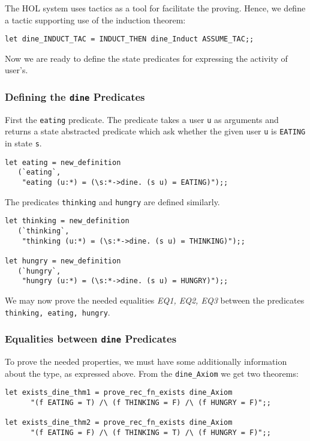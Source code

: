 The HOL system uses tactics as a tool for facilitate the proving.  Hence,
we define a tactic supporting use of the induction theorem:
{\footnotesize 
\begin{verbatim}
let dine_INDUCT_TAC = INDUCT_THEN dine_Induct ASSUME_TAC;;
\end{verbatim}
}

Now we are ready to define the state predicates for expressing the activity of
user's.

\subsubsection{Defining the {\tt dine} Predicates}

First the {\tt eating} predicate.  The predicate takes a user {\tt u} as
arguments and returns a state abstracted predicate which ask whether the given
user {\tt u} is {\tt EATING} in state {\tt s}.

{\footnotesize 
\begin{verbatim}
let eating = new_definition
   (`eating`,
    "eating (u:*) = (\s:*->dine. (s u) = EATING)");;
\end{verbatim}
}

The predicates {\tt thinking} and {\tt hungry} are defined similarly.

{\footnotesize 
\begin{verbatim}
let thinking = new_definition
   (`thinking`,
    "thinking (u:*) = (\s:*->dine. (s u) = THINKING)");;

let hungry = new_definition
   (`hungry`,
    "hungry (u:*) = (\s:*->dine. (s u) = HUNGRY)");;
\end{verbatim}
}

We may now prove the needed equalities {\it EQ1, EQ2, EQ3} between the
predicates {\tt thinking, eating, hungry}.

\subsubsection{Equalities between {\tt dine} Predicates}

To prove the needed properties, we must have some additionally information
about the type, as expressed above.  From the {\tt dine\_Axiom} we get two
theorems:
{\footnotesize 
\begin{verbatim}
let exists_dine_thm1 = prove_rec_fn_exists dine_Axiom 
      "(f EATING = T) /\ (f THINKING = F) /\ (f HUNGRY = F)";;

let exists_dine_thm2 = prove_rec_fn_exists dine_Axiom 
      "(f EATING = F) /\ (f THINKING = T) /\ (f HUNGRY = F)";;
\end{verbatim}
}

